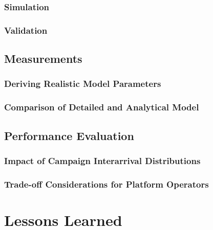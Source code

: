 \subsubsection*{Simulation}
\subsubsection*{Validation}
\subsection{Measurements}
\subsubsection*{Deriving Realistic Model Parameters}
\subsubsection*{Comparison of Detailed and Analytical Model}
\subsection{Performance Evaluation}
\subsubsection*{Impact of Campaign Interarrival Distributions}
\subsubsection*{Trade-off Considerations for Platform Operators}

\section{Lessons Learned}